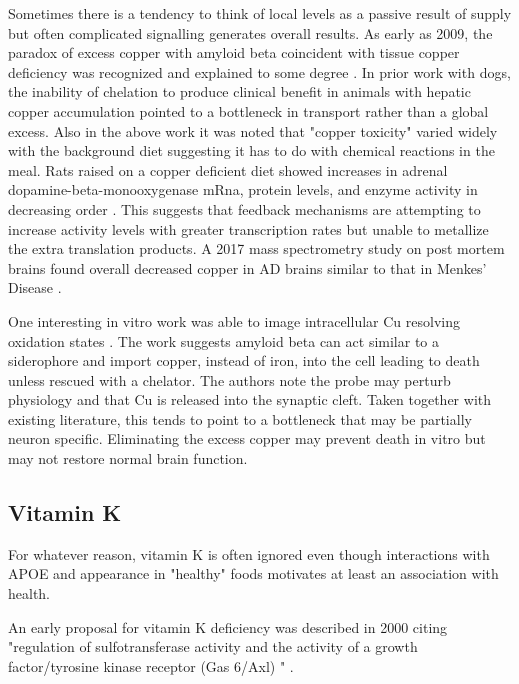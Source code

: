 Sometimes there is a tendency to think of local levels
as a passive result of supply but often complicated
signalling generates overall results.
As early as 2009, the paradox of excess copper with amyloid beta
coincident with tissue copper deficiency was recognized
and explained to some degree \cite{PMC2755914}.
In prior work with dogs, the inability of chelation to produce
clinical benefit in animals with hepatic copper accumulation
pointed to a bottleneck in transport rather than 
a global excess\cite{marchywka-MJM-2024-010-0.01rg}.
Also in the above work it was noted that "copper toxicity"
varied widely with the background diet suggesting
it has to do with chemical reactions in the meal.
Rats raised on a copper deficient diet showed
increases in adrenal dopamine-beta-monooxygenase 
mRna, protein levels, and enzyme activity in decreasing
order 
\cite{Prohaska_Brokate_Dietary_Copper_Deficiency_Alters_2001}.
This suggests that feedback mechanisms are attempting to 
increase activity levels with greater transcription
rates but unable to metallize the extra translation products. 
A 2017 mass spectrometry study on post mortem brains 
found overall decreased copper in AD brains similar to
that in Menkes' Disease \cite{10.1039/c7mt00074j}.

One interesting in vitro work was able to image intracellular
Cu resolving oxidation states \cite{Shao_Yang_Xu_Simultaneous_Imaging_2026}.
The work suggests amyloid beta can act similar to a siderophore and
import copper, instead of iron,  into the cell leading to death
unless rescued with a chelator. The authors note the probe may perturb
physiology and that Cu is released into the synaptic cleft.
Taken together with existing literature, this tends to point
to a bottleneck that may be partially neuron specific.
Eliminating the excess copper may prevent death in vitro but
may not restore normal brain function. 
 
\subsection{Vitamin K }

For whatever reason, vitamin K is often ignored even though 
interactions with APOE and appearance in "healthy" foods
motivates at least an association with health.

An early proposal for vitamin K deficiency was described in 2000
citing "regulation of sulfotransferase activity and the activity of a growth factor/tyrosine kinase receptor (Gas 6/Axl) " \cite{ALLISON2001151}.

